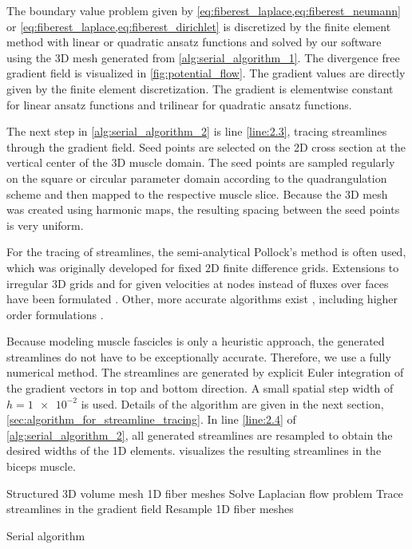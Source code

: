 The boundary value problem given by \cref{eq:fiberest_laplace,eq:fiberest_neumann}  or \cref{eq:fiberest_laplace,eq:fiberest_dirichlet} is discretized by the finite element method with linear or quadratic ansatz functions and solved by our software \opendihu{} using the 3D mesh generated from \cref{alg:serial_algorithm_1}. The divergence free gradient field is visualized in \cref{fig:potential_flow}. The gradient values are directly given by the finite element discretization. The gradient is elementwise constant for linear ansatz functions and trilinear for quadratic ansatz functions.

The next step in \cref{alg:serial_algorithm_2} is line \ref{line:2.3}, tracing streamlines through the gradient field. Seed points are selected on the 2D cross section at the vertical center of the 3D muscle domain. The seed points are sampled regularly on the square or circular parameter domain according to the quadrangulation scheme and then mapped to the respective muscle slice.
Because the 3D mesh was created using harmonic maps, the resulting spacing between the seed points is very uniform.

For the tracing of streamlines, the semi-analytical Pollock's method \cite{Pollock1988} is often used, which was originally developed for fixed 2D finite difference grids. Extensions to irregular 3D grids and for given velocities at nodes instead of fluxes over faces have been formulated \cite{HAEGLAND2007Streamline}. Other, more accurate algorithms exist \cite{cordes1992continuous}, including higher order formulations \cite{juanes2006unified}.

Because modeling muscle fascicles is only a heuristic approach, the generated streamlines do not have to be exceptionally accurate. Therefore, we use a fully numerical method. The streamlines are generated by explicit Euler integration of the gradient vectors in top and bottom direction. A small spatial step width of $h=\num{1e-2}$ is used. Details of the algorithm are given in the next section, \cref{sec:algorithm_for_streamline_tracing}. In line \ref{line:2.4} of \cref{alg:serial_algorithm_2}, all generated streamlines are resampled to obtain the desired widths of the 1D elements.
 visualizes the resulting streamlines in the biceps muscle.

\begin{algorithm}
  \begin{algorithmic}[1]%
    \Statex{}
    \Require Structured 3D volume mesh
    \Ensure 1D fiber meshes
    \Statex
    \State Solve Laplacian flow problem   \label{line:2.2}
    \State Trace streamlines in the gradient field  \label{line:2.3}
    \State Resample 1D fiber meshes \label{line:2.4}
    \EndProcedure
  \end{algorithmic}%
  \caption{Serial algorithm}%
  \label{alg:serial_algorithm_2}%
\end{algorithm}%

